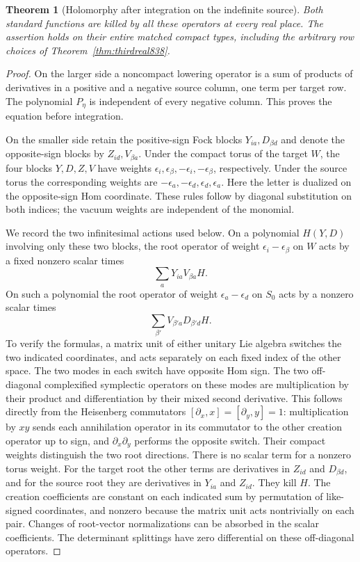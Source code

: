 \documentclass[a4paper,11pt]{article}
\newtheorem{theorem}[proposition]{Theorem}
\theoremstyle{definition}
\theoremstyle{remark}
\numberwithin{equation}{section}
\begin{document}
\begin{theorem}[Holomorphy after integration on the indefinite source]
\leavevmode\label{thm:thirdholomorphic841}
Both standard functions are killed by all these operators
at every real place. The assertion holds on their entire
matched compact types, including the arbitrary row choices
of Theorem~\ref{thm:thirdreal838}.
\end{theorem}
\begin{proof}
On the larger side a noncompact lowering operator is a sum
of products of derivatives in a positive and a negative
source column, one term per target row. The polynomial
\(P_\eta\) is independent of every negative column. This
proves the equation before integration.

On the smaller side retain the positive-sign Fock blocks
\(Y_{ia},D_{\beta d}\) and denote the opposite-sign blocks
by \(Z_{id},V_{\beta a}\). Under the compact torus of
the target \(W\), the four blocks \(Y,D,Z,V\) have weights
\(\epsilon_i,\epsilon_\beta,-\epsilon_i,-\epsilon_\beta\),
respectively. Under the source torus the corresponding
weights are \(-\epsilon_a,-\epsilon_d,\epsilon_d,\epsilon_a\).
Here the letter is dualized on the opposite-sign Hom
coordinate. These rules follow by diagonal substitution on
both indices; the vacuum weights are independent of the
monomial.

We record the two infinitesimal actions used below. On a
polynomial \(H(Y,D)\) involving only these two blocks, the
root operator of weight \(\epsilon_i-\epsilon_\beta\) on
\(W\) acts by a fixed nonzero scalar times
\[
                         \sum_a Y_{ia}V_{\beta a}H .
\]
On such a polynomial the root operator of weight
\(\epsilon_a-\epsilon_d\) on \(S_0\) acts by a nonzero
scalar times
\[
                         \sum_{\beta'} V_{\beta'a}D_{\beta'd}H .
\]
To verify the formulas, a matrix unit of either unitary
Lie algebra switches the two indicated coordinates,
and acts separately on each fixed index of the other
space. The two modes in each switch have opposite Hom
sign. The two off-diagonal complexified symplectic operators
on these modes are multiplication by their product and
differentiation by their mixed second derivative. This
follows directly from the Heisenberg commutators
\([\partial_x,x]=[\partial_y,y]=1\): multiplication by
\(xy\) sends each annihilation operator in its commutator
to the other creation operator up to sign, and
\(\partial_x\partial_y\) performs the opposite switch.
Their compact weights distinguish the two root directions.
There is no scalar term for a nonzero torus weight. For the
target root the other terms are derivatives in \(Z_{id}\)
and \(D_{\beta d}\), and for the source root they are
derivatives in \(Y_{ia}\) and \(Z_{id}\). They kill \(H\).
The creation coefficients are constant on each indicated
sum by permutation of like-signed coordinates, and nonzero
because the matrix unit acts nontrivially on each pair.
Changes of root-vector normalizations can be absorbed in
the scalar coefficients. The determinant splittings have
zero differential on these off-diagonal operators.


\end{proof}
\end{document}
